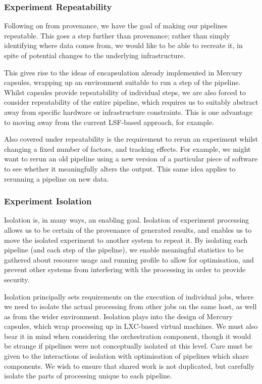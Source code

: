 \documentclass[10pt,a4paper]{article}
\newcommand{\npar}{\par\noindent\space}
\begin{document}
\subsubsection{Experiment Repeatability}
\label{sec:repeatability}
\npar Following on from provenance, we have the goal of making our pipelines repeatable. This goes a step further than provenance; rather than simply identifying where data comes from, we would like to be able to recreate it, in spite of potential changes to the underlying infrastructure. 
\npar This gives rise to the ideas of encapsulation already implemented in Mercury capsules, wrapping up an environment suitable to run a step of the pipeline. Whilst capsules provide repeatability of individual steps, we are also forced to consider repeatability of the entire pipeline, which requires us to suitably abstract away from specific hardware or infrastructure constraints. This is one advantage to moving away from the current LSF-based approach, for example.
\npar Also covered under repeatability is the requirement to rerun an experiment whilst changing a fixed number of factors, and tracking effects. For example, we might want to rerun an old pipeline using a new version of a particular piece of software to see whether it meaningfully alters the output. This same idea applies to rerunning a pipeline on new data.

\subsubsection{Experiment Isolation}
\npar Isolation is, in many ways, an enabling goal. Isolation of experiment processing allows us to be certain of the provenance of generated results, and enables us to move the isolated experiment to another system to repeat it. By isolating each pipeline (and each step of the pipeline), we enable meaningful statistics to be gathered about resource usage and running profile to allow for optimisation, and prevent other systems from interfering with the processing in order to provide security.
\npar Isolation principally sets requirements on the execution of individual jobs, where we need to isolate the actual processing from other jobs on the same host, as well as from the wider environment. Isolation plays into the design of Mercury capsules, which wrap processing up in LXC-based virtual machines. We must also bear it in mind when considering the orchestration component, though it would be strange if pipelines were not conceptually isolated at this level. Care must be given to the interactions of isolation with optimisation of pipelines which share components. We wish to ensure that shared work is not duplicated, but carefully isolate the parts of processing unique to each pipeline.
\end{document}
